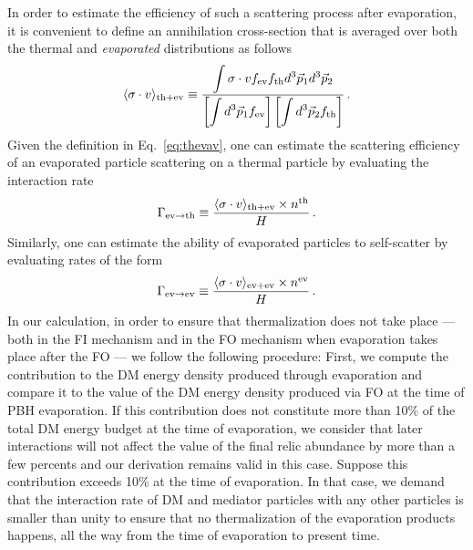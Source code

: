\documentclass[aps,prd,reprint,twocolumn,preprintnumbers,floatfix,nofootinbib]{revtex4-1}
\newcommand{\be}{\begin{equation}}
\newcommand{\ee}{\end{equation}}
\begin{document}
In order to estimate the efficiency of such a scattering process after evaporation, it is convenient to define an annihilation cross-section that is averaged over both the thermal and {\em evaporated} distributions as follows
\be \label{eq:thevav}
\langle\sigma \cdot v\rangle_{\rm th+ev}\equiv\frac{\displaystyle\int \sigma \cdot v f_{\rm ev} f_{\rm th} d^{3} \vec{p}_1 d^{3} \vec{p}_2}{\left[\displaystyle\int d^{3} \vec{p}_1 f_{\rm ev}\right]\left[\displaystyle\int d^{3} \vec{p}_2 f_{\rm th}\right]}\,.
\ee
 Given the definition in Eq.~\ref{eq:thevav}, one can estimate the scattering efficiency of an evaporated particle scattering on a thermal particle by evaluating the interaction rate
\be
\Gamma_{\rm ev\to th}\equiv \frac{\langle\sigma \cdot v\rangle_{\rm th+ev} \times n^{\rm th}}{H}\,.
\ee
Similarly, one can estimate the ability of evaporated particles to self-scatter by evaluating rates of the form
\be
\Gamma_{\rm ev\to ev}\equiv \frac{\langle\sigma \cdot v\rangle_{\rm ev+ev} \times n^{\rm ev}}{H}\,.
\ee
In our calculation, in order to ensure that thermalization does not take place --- both in the FI mechanism and in the FO mechanism when evaporation takes place after the FO ---  we follow the following procedure: First, we compute the contribution to the DM energy density produced through evaporation and compare it to the value of the DM energy density produced via FO at the time of PBH evaporation. If this contribution does not constitute more than 10\% of the total DM energy budget at the time of evaporation, we consider that later interactions will not affect the value of the final relic abundance by more than a few percents and our derivation remains valid in this case. Suppose this contribution exceeds 10\% at the time of evaporation. In that case, we demand that the interaction rate of DM and mediator particles with any other particles is smaller than unity to ensure that no thermalization of the evaporation products happens, all the way from the time of evaporation to present time.
\end{document}
